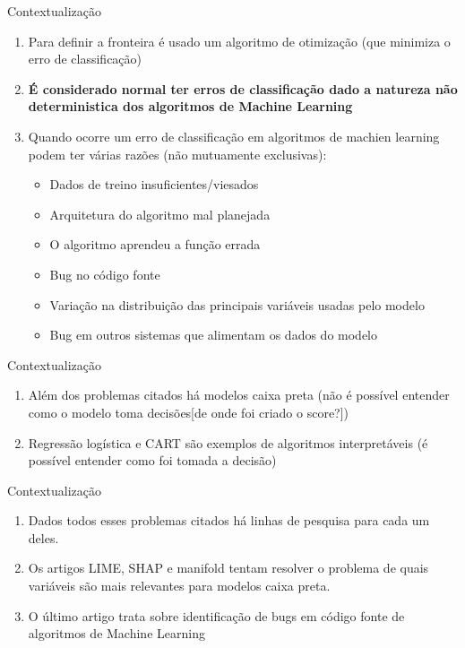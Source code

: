 \begin{frame}
	\begin{block}{Contextualização}
		\begin{enumerate}
			\item Para definir a fronteira é usado um algoritmo de otimização (que minimiza o erro de classificação)
			\item \textbf{É considerado normal ter erros de classificação dado a natureza não deterministica dos algoritmos de Machine Learning}
			\item Quando ocorre um erro de classificação em algoritmos de machien learning podem ter várias razões (não mutuamente exclusivas):
				\begin{itemize}
					\item Dados de treino insuficientes/viesados
					\item Arquitetura do algoritmo mal planejada
					\item O algoritmo aprendeu a função errada
					\item Bug no código fonte
					\item Variação na distribuição das principais variáveis usadas pelo modelo
					\item Bug em outros sistemas que alimentam os dados do modelo
				\end{itemize}
		\end{enumerate}
	\end{block}
\end{frame}


\begin{frame}
	\begin{block}{Contextualização}
		\begin{enumerate}
			\item Além dos problemas citados há modelos caixa preta (não é possível entender como o modelo toma decisões[de onde foi criado o score?])
			\item Regressão logística e CART são exemplos de algoritmos interpretáveis (é possível entender como foi tomada a decisão)
		\end{enumerate}
	\end{block}
\end{frame}



\begin{frame}
	\begin{block}{Contextualização}
		\begin{enumerate}
			\item Dados todos esses problemas citados há linhas de pesquisa para cada um deles.
			\item Os artigos LIME, SHAP e manifold tentam resolver o problema de quais variáveis são mais relevantes para modelos caixa preta.
			\item O último artigo trata sobre identificação de bugs em código fonte de algoritmos de Machine Learning
		\end{enumerate}
	\end{block}
\end{frame}

